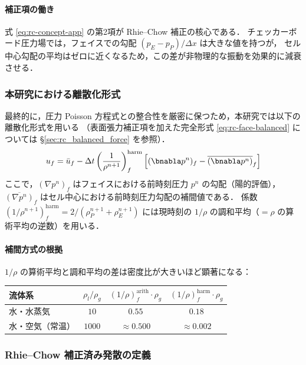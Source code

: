 \paragraph{補正項の働き}
式 \eqref{eq:rc-concept-app} の第2項が Rhie--Chow 補正の核心である．
チェッカーボード圧力場では，フェイスでの勾配 $(p_E-p_P)/\Delta x$ は大きな値を持つが，
セル中心勾配の平均はゼロに近くなるため，この差が非物理的な振動を効果的に減衰させる．

\subsubsection{本研究における離散化形式}
\label{sec:rc_implementation}
最終的に，圧力 Poisson 方程式との整合性を厳密に保つため，本研究では以下の離散化形式を用いる
（表面張力補正項を加えた完全形式 \eqref{eq:rc-face-balanced} については §\ref{sec:rc_balanced_force} を参照）．
\begin{equation}
 u_f = \bar{u}_f - \Delta t\left( \frac{1}{\rho^{n+1}} \right)^{\mathrm{harm}}_f \left[ (\bnabla p^n)_f - \overline{(\bnabla p^n)}_f \right]
 \label{eq:rc-face}
\end{equation}
ここで，$(\nabla p^n)_f$ はフェイスにおける前時刻圧力 $p^n$ の勾配（陽的評価），
$\overline{(\nabla p^n)}_f$ はセル中心における前時刻圧力勾配の補間値である．
係数 $(1/\rho^{n+1})_f^\mathrm{harm} = 2/(\rho^{n+1}_P + \rho^{n+1}_E)$ には現時刻の $1/\rho$ の調和平均（$= \rho$ の算術平均の逆数）を用いる．

\paragraph{補間方式の根拠}
$1/\rho$ の算術平均と調和平均の差は密度比が大きいほど顕著になる：
\begin{center}
\begin{tabular}{lccc}
\hline
流体系 & $\rho_l/\rho_g$ & $(1/\rho)^{\mathrm{arith}}_f \cdot \rho_g$ & $(1/\rho)^{\mathrm{harm}}_f \cdot \rho_g$ \\
\hline
水・水蒸気 & $10$ & $0.55$ & $0.18$ \\
水・空気（常温） & $1000$ & $\approx 0.500$ & $\approx 0.002$ \\
\hline
\end{tabular}
\end{center}

\subsubsection{Rhie--Chow 補正済み発散の定義}
\label{sec:rc_divergence}

